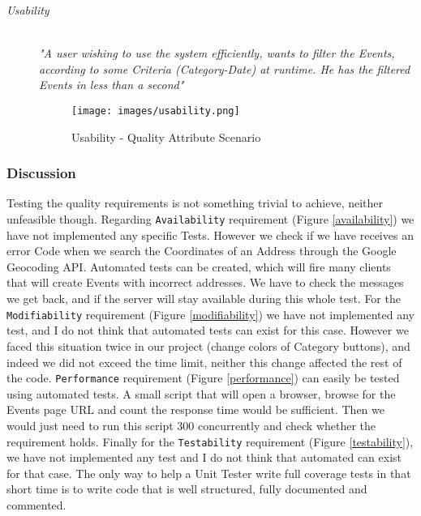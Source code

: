 \begin{description}
  \item[\emph{Usability}] \hfill \\
  \emph{"A user wishing to use the system efficiently, wants to filter the Events, according to some Criteria (Category-Date) at runtime. He has the filtered Events in less than a second"}
  \begin{figure}[H]
  	\centering
  	\texttt{[image: images/usability.png]}
  	\caption{Usability - Quality Attribute Scenario}
  	\label{usability}
  \end{figure}
  

\end{description}

\subsubsection{Discussion}

Testing the quality requirements is not something trivial to achieve, neither unfeasible though. Regarding \verb|Availability| requirement (Figure \ref{availability}) we have not implemented any specific Tests. However we check if we have receives an error Code when we search the Coordinates of an Address through the Google Geocoding API. Automated tests can be created, which will fire many clients that will create Events with incorrect addresses. We have to check the messages we get back, and if the server will stay available during this whole test. For the \verb|Modifiability| requirement (Figure \ref{modifiability})  we have not implemented any test, and I do not think  that automated tests can exist for this case. However we faced this situation twice in our project (change colors of Category buttons), and indeed we did not exceed the time limit, neither this change affected the rest of the code. \verb|Performance| requirement (Figure \ref{performance}) can easily be tested using automated tests. A small script that will open a browser, browse for the Events page URL and count the response time would be sufficient. Then we would just need to run this script 300 concurrently and check whether the requirement holds. Finally for the \verb|Testability| requirement (Figure \ref{testability}), we have not implemented any test and I do not think that automated can exist for that case. The only way to help a Unit Tester write full coverage tests in that short time is to write code that is well structured, fully documented and commented.


